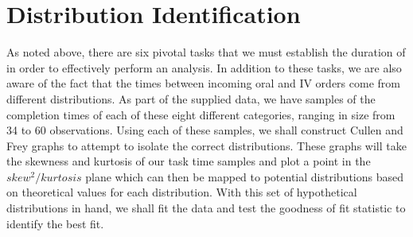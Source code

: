 \documentclass[10pt]{report}            %
\begin{document}
\section*{Distribution Identification}
As noted above, there are six pivotal tasks that we must establish the duration of in order to effectively perform an analysis. In addition to these tasks, we are also aware of the fact that the times between incoming oral and IV orders come from different distributions. As part of the supplied data, we have samples of the completion times of each of these eight different categories, ranging in size from 34 to 60 observations. Using each of these samples, we shall construct Cullen and Frey graphs to attempt to isolate the correct distributions. These graphs will take the skewness and kurtosis of our task time samples and plot a point in the $skew^2/kurtosis$ plane which can then be mapped to potential distributions based on theoretical values for each distribution. With this set of hypothetical distributions in hand, we shall fit the data and test the goodness of fit statistic to identify the best fit.
\end{document}
